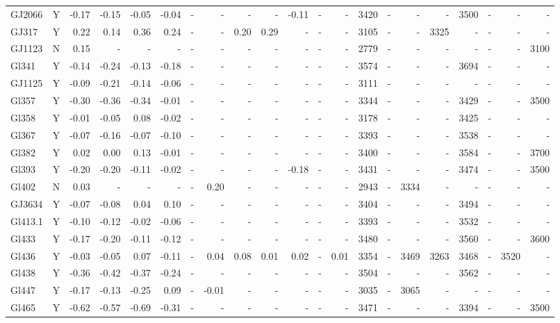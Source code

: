 \documentclass{aa}
\begin{document}
{\begin{landscape}
{\begin{longtable}{l c r r r r r r r r r r r | r r r r r r r r }
GJ2066 & Y & -0.17 & -0.15 & -0.05 & -0.04 & - & - & - & - & -0.11 & - & - & 3420 & - & - & - & 3500 & - & - & - \\
GJ317 & Y & 0.22 & 0.14 & 0.36 & 0.24 & - & - & 0.20 & 0.29 & - & - & - & 3105 & - & - & 3325 & - & - & - & - \\
GJ1123 & N & 0.15 & - & - & - & - & - & - & - & - & - & - & 2779 & - & - & - & - & - & - & 3100 \\
Gl341 & Y & -0.14 & -0.24 & -0.13 & -0.18 & - & - & - & - & - & - & - & 3574 & - & - & - & 3694 & - & - & - \\
GJ1125 & Y & -0.09 & -0.21 & -0.14 & -0.06 & - & - & - & - & - & - & - & 3111 & - & - & - & - & - & - & - \\
Gl357 & Y & -0.30 & -0.36 & -0.34 & -0.01 & - & - & - & - & - & - & - & 3344 & - & - & - & 3429 & - & - & 3500 \\
Gl358 & Y & -0.01 & -0.05 & 0.08 & -0.02 & - & - & - & - & - & - & - & 3178 & - & - & - & 3425 & - & - & - \\
Gl367 & Y & -0.07 & -0.16 & -0.07 & -0.10 & - & - & - & - & - & - & - & 3393 & - & - & - & 3538 & - & - & - \\
Gl382 & Y & 0.02 & 0.00 & 0.13 & -0.01 & - & - & - & - & - & - & - & 3400 & - & - & - & 3584 & - & - & 3700 \\
Gl393 & Y & -0.20 & -0.20 & -0.11 & -0.02 & - & - & - & - & -0.18 & - & - & 3431 & - & - & - & 3474 & - & - & 3500 \\
Gl402 & N & 0.03 & - & - & - & - & 0.20 & - & - & - & - & - & 2943 & - & 3334 & - & - & - & - & - \\
GJ3634 & Y & -0.07 & -0.08 & 0.04 & 0.10 & - & - & - & - & - & - & - & 3404 & - & - & - & 3494 & - & - & - \\
Gl413.1 & Y & -0.10 & -0.12 & -0.02 & -0.06 & - & - & - & - & - & - & - & 3393 & - & - & - & 3532 & - & - & - \\
Gl433 & Y & -0.17 & -0.20 & -0.11 & -0.12 & - & - & - & - & - & - & - & 3480 & - & - & - & 3560 & - & - & 3600 \\
Gl436 & Y & -0.03 & -0.05 & 0.07 & -0.11 & - & 0.04 & 0.08 & 0.01 & 0.02 & - & 0.01 & 3354 & - & 3469 & 3263 & 3468 & - & 3520 & - \\
Gl438 & Y & -0.36 & -0.42 & -0.37 & -0.24 & - & - & - & - & - & - & - & 3504 & - & - & - & 3562 & - & - & - \\
Gl447 & Y & -0.17 & -0.13 & -0.25 & 0.09 & - & -0.01 & - & - & - & - & - & 3035 & - & 3065 & - & - & - & - & - \\
Gl465 & Y & -0.62 & -0.57 & -0.69 & -0.31 & - & - & - & - & - & - & - & 3471 & - & - & - & 3394 & - & - & 3500 \\

\end{longtable}}
\end{landscape}}
\end{document}
